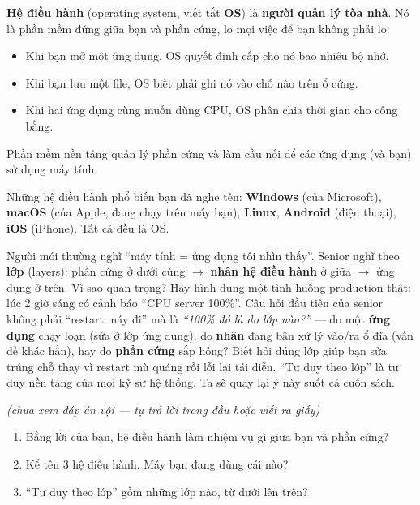 \documentclass[12pt,a4paper]{article}
\begin{document}
\textbf{Hệ điều hành} (operating system, viết tắt \textbf{OS}) là \textbf{người quản lý tòa nhà}. Nó là phần mềm đứng giữa bạn và phần cứng, lo mọi việc để bạn không phải lo:

\begin{itemize}[leftmargin=*]
  \item Khi bạn mở một ứng dụng, OS quyết định cấp cho nó bao nhiêu bộ nhớ.
  \item Khi bạn lưu một file, OS biết phải ghi nó vào chỗ nào trên ổ cứng.
  \item Khi hai ứng dụng cùng muốn dùng CPU, OS phân chia thời gian cho công bằng.
\end{itemize}

\begin{defbox}
Phần mềm nền tảng quản lý phần cứng và làm cầu nối để các ứng dụng (và bạn) sử dụng máy tính.
\end{defbox}

Những hệ điều hành phổ biến bạn đã nghe tên: \textbf{Windows} (của Microsoft), \textbf{macOS} (của Apple, đang chạy trên máy bạn), \textbf{Linux}, \textbf{Android} (điện thoại), \textbf{iOS} (iPhone). Tất cả đều là OS.

\begin{seniorbox}
Người mới thường nghĩ ``máy tính = ứng dụng tôi nhìn thấy''. Senior nghĩ theo \textbf{lớp} (layers): phần cứng ở dưới cùng $\rightarrow$ \textbf{nhân hệ điều hành} ở giữa $\rightarrow$ ứng dụng ở trên. Vì sao quan trọng? Hãy hình dung một tình huống production thật: lúc 2 giờ sáng có cảnh báo ``CPU server 100\%''. Câu hỏi đầu tiên của senior không phải ``restart máy đi'' mà là \textit{``100\% đó là do lớp nào?''} — do một \textbf{ứng dụng} chạy loạn (sửa ở lớp ứng dụng), do \textbf{nhân} đang bận xử lý vào/ra ổ đĩa (vấn đề khác hẳn), hay do \textbf{phần cứng} sắp hỏng? Biết hỏi đúng lớp giúp bạn sửa trúng chỗ thay vì restart mù quáng rồi lỗi lại tái diễn. ``Tư duy theo lớp'' là tư duy nền tảng của mọi kỹ sư hệ thống. Ta sẽ quay lại ý này suốt cả cuốn sách.
\end{seniorbox}

\begin{quizbox}
\textit{(chưa xem đáp án vội — tự trả lời trong đầu hoặc viết ra giấy)}
\begin{enumerate}[leftmargin=*]
  \item Bằng lời của bạn, hệ điều hành làm nhiệm vụ gì giữa bạn và phần cứng?
  \item Kể tên 3 hệ điều hành. Máy bạn đang dùng cái nào?
  \item ``Tư duy theo lớp'' gồm những lớp nào, từ dưới lên trên?
\end{enumerate}
\end{quizbox}
\end{document}

